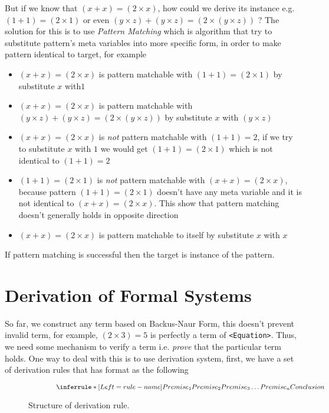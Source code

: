 \documentclass[master.tex]{subfiles}
\begin{document}
But if we know that $(x + x) = (2 \times x)$, how could we derive its instance e.g.
$(1 + 1) = (2 \times 1)$ or even $(y \times z) + (y \times z) = (2 \times (y \times z))$ ?
The solution for this is to use \emph{Pattern Matching} which is algorithm that
try to substitute pattern's meta variables into more specific form, in order to
make pattern identical to target, for example
\begin{itemize}
\item $(x + x) = (2 \times x)$ is pattern matchable with $(1 + 1) = (2 \times 1)$ by
  substitute $x$ with$1$
\item $(x + x) = (2 \times x)$ is pattern matchable with $(y \times z) + (y
  \times z) = (2 \times (y \times z))$ by substitute $x$ with $(y \times z)$
\item $(x + x) = (2 \times x)$ is \emph{not} pattern matchable with $(1 + 1) = 2$, if
  we try to substitute $x$ with $1$ we would get $(1 + 1) = (2 \times 1)$ which is not
  identical to $(1 + 1) = 2$
\item $(1 + 1) = (2 \times 1)$ is \emph{not} pattern matchable with $(x + x) =
  (2 \times x)$, because pattern $(1 + 1) = (2 \times 1)$ doesn't have any meta
  variable and it is not identical to $(x + x) = (2 \times x)$. This show that
  pattern matching doesn't generally holds in opposite direction
\item $(x + x) = (2 \times x)$ is pattern matchable to itself by substitute $x$ with $x$
\end{itemize}

If pattern matching is successful then the target is instance of the pattern.

\section{Derivation of Formal Systems}

So far, we construct any term based on Backus-Naur Form, this doesn't prevent
invalid term, for example, $(2 \times 3) = 5$ is perfectly a term of
\texttt{<Equation>}. Thus, we need some mechanism to verify a term i.e.
\emph{prove} that the particular term holds. One way to deal with this is to use
derivation system, first, we have a set of derivation rules that has format as
the following

\begin{figure}[H]
\centering
$$
\qquad \qquad \derivRule{rule-name}{Conclusion}{Premise_1 \\ Premise_2 \\ Premise_3 \\ \ldots \\
  Premise_n}
$$
\caption{Structure of derivation rule.}
\end{figure}
\newpage
\end{document}
